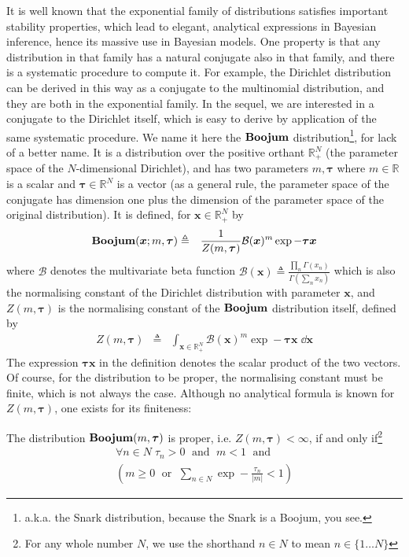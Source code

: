 It is well known that the exponential family of distributions satisfies important stability properties, which lead to elegant, analytical expressions in Bayesian inference, hence its massive use in Bayesian models. One property is that any distribution in that family has a natural conjugate also in that family, and there is a systematic procedure to compute it. For example, the Dirichlet distribution can be derived in this way as a conjugate to the multinomial distribution, and they are both in the exponential family. In the sequel, we are interested in a conjugate to the Dirichlet itself, which is easy to derive by application of the same systematic procedure. We name it here the $\mathbf{Boojum}$ distribution\footnote{a.k.a. the Snark distribution, because the Snark is a Boojum, you see.}, for lack of a better name. It is a distribution over the positive orthant $\mathbb{R}_+^N$ (the parameter space of the $N$-dimensional Dirichlet), and has two parameters $m,\boldsymbol{\tau}$ where $m\in\mathbb{R}$ is a scalar and $\boldsymbol{\tau}\in\mathbb{R}^N$ is a vector (as a general rule, the parameter space of the conjugate has dimension one plus the dimension of the parameter space of the original distribution). It is defined, for $\boldsymbol{x}\in\mathbb{R}_+^N$ by
\begin{eqnarray}
\mathbf{Boojum}(\boldsymbol{x};m,\boldsymbol{\tau}) & \triangleq & \frac{1}{Z(m,\boldsymbol{\tau})}\mathcal{B}(\boldsymbol{x})^m\exp-\boldsymbol{\tau}\boldsymbol{x}
\end{eqnarray}
where $\mathcal{B}$ denotes the multivariate beta function $\mathcal{B}(\boldsymbol{x})\triangleq\frac{\prod_n\Gamma(x_n)}{\Gamma(\sum_nx_n)}$ which is also the normalising constant of the Dirichlet distribution with parameter $\boldsymbol{x}$, and $Z(m,\boldsymbol{\tau})$ is the normalising constant of the $\mathbf{Boojum}$ distribution itself, defined by
\begin{eqnarray*}
Z(m,\boldsymbol{\tau}) & \triangleq & \int_{\boldsymbol{x}\in\mathbb{R}_+^N}\mathcal{B}(\boldsymbol{x})^m\exp-\boldsymbol{\tau} \boldsymbol{x}\;\dd{\boldsymbol{x}}
\end{eqnarray*}
The expression $\boldsymbol{\tau} \boldsymbol{x}$ in the definition denotes the scalar product of the two vectors. Of course, for the distribution to be proper, the normalising constant must be finite, which is not always the case. Although no analytical formula is known for $Z(m,\boldsymbol{\tau})$, one exists for its finiteness:
\begin{proposition}
\label{prop:mbeta-proper}
The distribution $\mathbf{Boojum}(m,\boldsymbol{\tau})$ is proper, i.e. $Z(m,\boldsymbol{\tau})<\infty$, if and only if\footnote{For any whole number $N$, we use the shorthand $n\in N$ to mean $n\in\{1\ldots N\}$}
\[
\begin{array}{l}
\forall n\in N\;\tau_n>0 \;\textrm{ and }\; m<1 \;\textrm{ and }\\
(m\geq0 \;\textrm{ or }\; \sum_{n\in N}\exp-\frac{\tau_n}{|m|}<1)
\end{array}
\]
\end{proposition}
